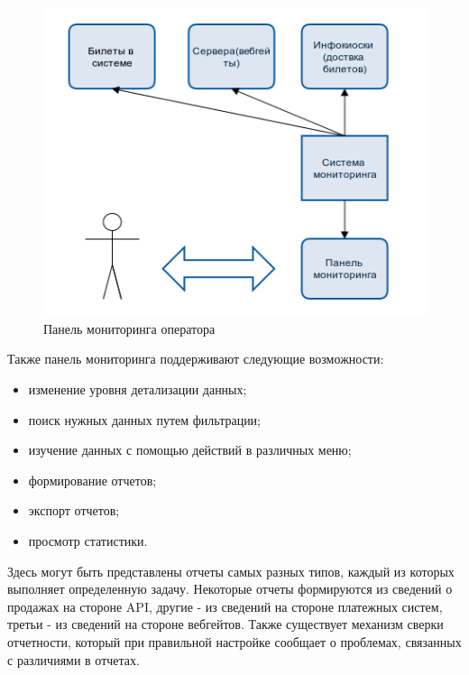 \begin{figure}[H]
    \centering
  \includegraphics[width=1\textwidth]{images/panel.png}
    \caption{Панель мониторинга оператора}
    \label{fig:panel.png}
\end{figure}

Также панель мониторинга поддерживают следующие возможности:

\begin{itemize}
  \item изменение уровня детализации данных;
    \item поиск нужных данных путем фильтрации;
    \item изучение данных с помощью действий в различных меню;
    \item формирование отчетов;
    \item экспорт отчетов;
  \item просмотр статистики.
\end{itemize}


Здесь могут быть представлены отчеты самых разных типов, каждый из которых выполняет определенную задачу. Некоторые отчеты формируются из сведений о продажах на стороне API, другие - из сведений на стороне платежных систем, третьи - из сведений на стороне вебгейтов. Также существует механизм сверки отчетности, который при правильной настройке сообщает о проблемах, связанных с различиями в отчетах.
















\newpage